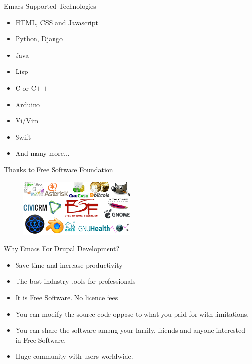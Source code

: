 \documentclass[english,12pt,presentation]{beamer}
\begin{document}
\begin{frame}{Emacs Supported Technologies}
\begin{itemize}
\pause \item HTML, CSS and Javascript
\pause \item Python, Django
\pause \item Java
\pause \item Lisp
\pause \item C or C$++$
\pause \item Arduino
\pause \item Vi/Vim
\pause \item Swift
\pause \item And many more...
\end{itemize}
\end{frame}

\begin{frame}{Thanks to Free Software Foundation}
\begin{figure}
\centering
\includegraphics[width=220]{images/fsf.png}
\end{figure}
\end{frame}

\begin{frame}{Why Emacs For Drupal Development?}
\begin{itemize}
\pause \item Save time and increase productivity
\pause \item The best industry tools for professionals
\pause \item It is Free Software. No licence fees
\pause \item You can modify the source code oppose to what you paid for with limitations.
\pause \item You can share the software among your family, friends and anyone interested in Free Software.
\pause \item Huge community with users worldwide.
\end{itemize}
\end{frame}
\end{document}
